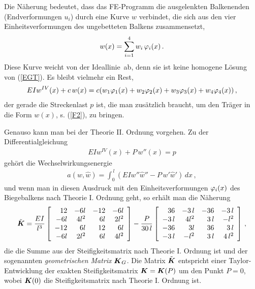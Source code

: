 Die N\"{a}herung  bedeutet, dass das FE-Programm die ausgelenkten Balkenenden (Endverformungen $u_i$) durch eine Kurve $w$ verbindet, die sich aus den vier Einheitsverformungen des ungebetteten Balkens zusammensetzt,
\begin{align}\label{F2}
 w(x) = \sum_{i
= 1}^4 w_i \, \varphi_i(x) \,.
\end{align}
Diese Kurve weicht von der \glq Ideallinie\grq\ ab, denn sie ist keine homogene L\"{o}sung
von (\ref{EGT}). Es bleibt vielmehr ein Rest,
\begin{align}
 EI w^{IV}(x) + c \,w(x) = c
(w_1 \varphi_1(x) + w_2 \varphi_2(x) + w_3 \varphi_3(x) + w_4 \varphi_4(x) )\,,
\end{align}
der gerade die Streckenlast $p$ ist, die man zus\"{a}tzlich braucht, um den Tr\"{a}ger in die
Form $w(x)$, s. (\ref{F2}), zu bringen.

Genauso kann man bei der Theorie II. Ordnung vorgehen. Zu der Differentialgleichung
\begin{align}\label{IIGL}
EI w^{IV}(x) + P \,w''(x) =  p
\end{align}
geh\"{o}rt die Wechselwirkungsenergie
\begin{align}\label{IIWeak}
a(w,\hat{w}) = \int_0^{\,l}( EI w'' \hat{w}'' - P \,w' \hat{w}') \, dx\,,
\end{align}
und wenn man in diesen Ausdruck  mit den Einheitsverformungen $\varphi_i(x)$ des Biegebalkens nach Theorie I. Ordnung geht, so erh\"{a}lt man die N\"{a}herung
\begin{align}\label{IIN} \tilde{ \mbox{\boldmath $K$}} =
\frac{EI}{l^3}\left[ \begin{array}{r r r r}
 12 & -6l & -12 &-6l \\
 -6l & 4l^2 & 6l &2l^2 \\
 -12 & 6l & 12 & 6l \\
 -6l &2l^2 &6l &4l^2
 \end{array}
  \right] - \frac{P}{30\,l}
 \left[ \begin{array}{r r r r}
 36 & -3\,l & -36 & -3\,l \\
 -3\,l & 4l^2 & 3\,l &-l^2 \\
 -36 & 3l & 36 & 3\,l \\
 -  3\,l &-l^2 &3\,l &4\,l^2
 \end{array}
  \right]\,,
\end{align}
die die Summe aus der Steifigkeitsmatrix nach Theorie I. Ordnung ist und der sogenannten {\em geometrischen Matrix} $\mbox{\boldmath $K$}_G$. Die Matrix $\tilde{\mbox{\boldmath $K$}}$ entspricht einer Taylor-Entwicklung der exakten Steifigkeitsmatrix $\mbox{\boldmath $K$} = \mbox{\boldmath $K$}(P)$ um den Punkt $P = 0$, wobei $\mbox{\boldmath $K$}(0)$ die Steifigkeitsmatrix nach Theorie I. Ordnung ist.


